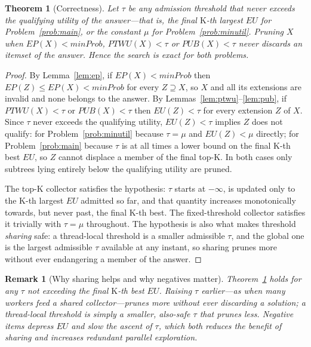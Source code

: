 \documentclass[pdflatex,sn-vancouver-num]{sn-jnl}
\theoremstyle{thmstyleone}%
\newtheorem{theorem}{Theorem}%
\theoremstyle{thmstyletwo}%
\newtheorem{remark}{Remark}%
\theoremstyle{thmstylethree}%
\newcommand{\EU}{\mathit{EU}}
\newcommand{\EP}{\mathit{EP}}
\newcommand{\PTWU}{\mathit{PTWU}}
\newcommand{\PUB}{\mathit{PUB}}
\newcommand{\minprob}{\mathit{minProb}}
\newcommand{\itemset}{X}
\newcommand{\Kk}{\mathrm{K}}
\begin{document}
\begin{theorem}[Correctness]\label{thm:correct}
Let $\tau$ be any admission threshold that never exceeds the qualifying
utility of the answer---that is, the final $\Kk$-th largest $\EU$ for
Problem~\ref{prob:main}, or the constant $\mu$ for
Problem~\ref{prob:minutil}. Pruning $\itemset$ when
$\EP(\itemset)<\minprob$, $\PTWU(\itemset)<\tau$ or $\PUB(\itemset)<\tau$
never discards an itemset of the answer. Hence the search is exact for
both problems.
\end{theorem}
\begin{proof}
By Lemma~\ref{lem:ep}, if $\EP(\itemset)<\minprob$ then
$\EP(Z)\le\EP(\itemset)<\minprob$ for every $Z\supseteq\itemset$, so
$\itemset$ and all its extensions are invalid and none belongs to the
answer. By Lemmas~\ref{lem:ptwu}--\ref{lem:pub}, if
$\PTWU(\itemset)<\tau$ or $\PUB(\itemset)<\tau$ then $\EU(Z)<\tau$ for
every extension $Z$ of $\itemset$. Since $\tau$ never exceeds the
qualifying utility, $\EU(Z)<\tau$ implies $Z$ does not qualify: for
Problem~\ref{prob:minutil} because $\tau=\mu$ and $\EU(Z)<\mu$
directly; for Problem~\ref{prob:main} because $\tau$ is at all times a
lower bound on the final $\Kk$-th best $\EU$, so $Z$ cannot displace a
member of the final top-$\Kk$. In both cases only subtrees lying
entirely below the qualifying utility are pruned.
 
The top-$\Kk$ collector satisfies the hypothesis: $\tau$ starts at
$-\infty$, is updated only to the $\Kk$-th largest $\EU$ admitted so
far, and that quantity increases monotonically towards, but never past,
the final $\Kk$-th best. The fixed-threshold collector satisfies it
trivially with $\tau=\mu$ throughout. The hypothesis is also what makes
threshold \emph{sharing} safe: a thread-local threshold is a smaller
admissible $\tau$, and the global one is the largest admissible $\tau$
available at any instant, so sharing prunes more without ever
endangering a member of the answer.
\end{proof}

\begin{remark}[Why sharing helps and why negatives matter]\label{rem:sharing}
Theorem~\ref{thm:correct} holds for any $\tau$ not exceeding the final $\Kk$-th best
$\EU$. Raising $\tau$ earlier---as when many workers feed a shared
collector---prunes more without ever discarding a solution; a thread-local
threshold is simply a smaller, also-safe $\tau$ that prunes less. Negative items
depress $\EU$ and slow the ascent of $\tau$, which both reduces the benefit of
sharing and increases redundant parallel exploration.
\end{remark}
\end{document}
